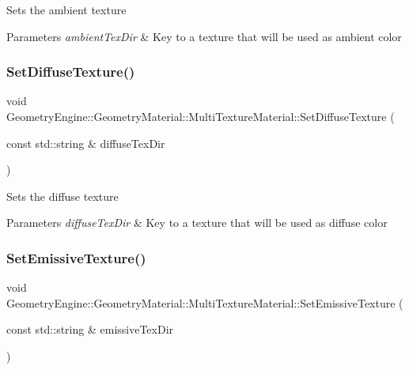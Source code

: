Sets the ambient texture 
\begin{DoxyParams}{Parameters}
{\em ambient\+Tex\+Dir} & Key to a texture that will be used as ambient color \\
\hline
\end{DoxyParams}
\mbox{\label{class_geometry_engine_1_1_geometry_material_1_1_multi_texture_material_a51249ca0c845bfd39ea3ddc90254092d}} 
\subsubsection{\texorpdfstring{SetDiffuseTexture()}{SetDiffuseTexture()}}
{\footnotesize\ttfamily void Geometry\+Engine\+::\+Geometry\+Material\+::\+Multi\+Texture\+Material\+::\+Set\+Diffuse\+Texture (\begin{DoxyParamCaption}\item[{const std\+::string \&}]{diffuse\+Tex\+Dir }\end{DoxyParamCaption})}

Sets the diffuse texture 
\begin{DoxyParams}{Parameters}
{\em diffuse\+Tex\+Dir} & Key to a texture that will be used as diffuse color \\
\hline
\end{DoxyParams}
\mbox{\label{class_geometry_engine_1_1_geometry_material_1_1_multi_texture_material_ad0ca544526e65dcd519cd0e82fc4bc7f}} 
\subsubsection{\texorpdfstring{SetEmissiveTexture()}{SetEmissiveTexture()}}
{\footnotesize\ttfamily void Geometry\+Engine\+::\+Geometry\+Material\+::\+Multi\+Texture\+Material\+::\+Set\+Emissive\+Texture (\begin{DoxyParamCaption}\item[{const std\+::string \&}]{emissive\+Tex\+Dir }\end{DoxyParamCaption})}

